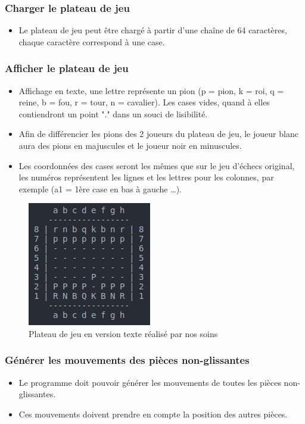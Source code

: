 \documentclass{article}
\begin{document}
\subsubsection{Charger le plateau de jeu}
\begin{itemize}
    \item Le plateau de jeu peut être chargé à partir d'une chaîne de 64 caractères, chaque caractère correspond à une case.
\end{itemize}
\medskip
\medskip
\subsubsection{Afficher le plateau de jeu}
\medskip
\begin{itemize}
    \item Affichage en texte, une lettre représente un pion (p = pion, k = roi, q = reine,
    b = fou, r = tour, n = cavalier).
    Les cases vides, quand à elles contiendront un point "." dans un souci de lisibilité.
    \item Afin de différencier les pions des 2 joueurs du plateau de jeu, le joueur blanc aura des pions en majuscules et le joueur noir en minuscules.
    \item Les coordonnées des cases seront les mêmes que sur le jeu d'échecs original, les numéros représentent les lignes et les lettres pour les colonnes, par exemple (a1 = 1ère case en bas à gauche \dots).
\end{itemize}
\begin{figure}[h]
\centering
\includegraphics[scale = 0.5]{img/pdp_chess_board.png}
\caption{Plateau de jeu en version texte réalisé par nos soins}
\end{figure}
\medskip
\subsubsection{Générer les mouvements des pièces non-glissantes}
\begin{itemize}
    \item Le programme doit pouvoir générer les mouvements de toutes les pièces non-glissantes.
    \item Ces mouvements doivent prendre en compte la position des autres pièces.
\end{itemize}
\medskip
\end{document}
